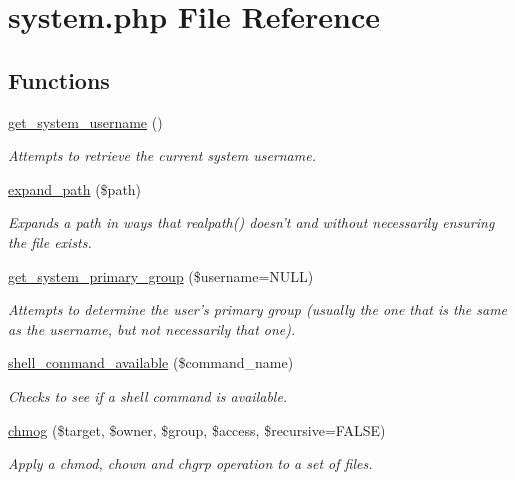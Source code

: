 \hypertarget{system_8php}{\section{system.\-php File Reference}
\label{system_8php}
}
\subsection*{Functions}
\begin{DoxyCompactItemize}
\item 
\hyperlink{system_8php_a9ee2cecceab0183d4131fb3bada09b06}{get\-\_\-system\-\_\-username} ()
\begin{DoxyCompactList}\small\item\em Attempts to retrieve the current system username. \end{DoxyCompactList}\item 
\hyperlink{system_8php_a42c75bda6715af3454dc8780c4ff2fe5}{expand\-\_\-path} (\$path)
\begin{DoxyCompactList}\small\item\em Expands a path in ways that realpath() doesn't and without necessarily ensuring the file exists. \end{DoxyCompactList}\item 
\hyperlink{system_8php_a2f17c192f771840162549a7ec741723f}{get\-\_\-system\-\_\-primary\-\_\-group} (\$username=N\-U\-L\-L)
\begin{DoxyCompactList}\small\item\em Attempts to determine the user's primary group (usually the one that is the same as the username, but not necessarily that one). \end{DoxyCompactList}\item 
\hyperlink{system_8php_a45b2a5f8e0b0ecf6c6751b2af8500a57}{shell\-\_\-command\-\_\-available} (\$command\-\_\-name)
\begin{DoxyCompactList}\small\item\em Checks to see if a shell command is available. \end{DoxyCompactList}\item 
\hyperlink{system_8php_ad69548f9b921ea81ee4b4e0f64101ba7}{chmog} (\$target, \$owner, \$group, \$access, \$recursive=F\-A\-L\-S\-E)
\begin{DoxyCompactList}\small\item\em Apply a chmod, chown and chgrp operation to a set of files. \end{DoxyCompactList}\item 

\end{DoxyCompactItemize}
